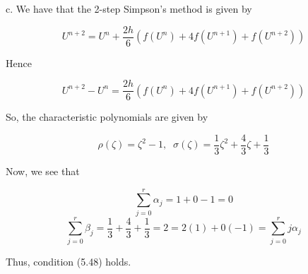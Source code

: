 \begin{solution}
    c. We have that the 2-step Simpson's method is given by

    $$U^{n+2}=U^{n}+\frac{2h}{6}(f(U^n)+4f(U^{n+1})+f(U^{n+2}))$$

    Hence

    $$U^{n+2}-U^{n}=\frac{2h}{6}(f(U^n)+4f(U^{n+1})+f(U^{n+2}))$$

    So, the characteristic polynomials are given by

    $$\rho(\zeta)=\zeta^2-1,\;\; \sigma(\zeta)=\frac13\zeta^2+\frac43\zeta+\frac13$$

    Now, we see that

    $$\sum_{j=0}^r\alpha_j=1+0-1=0$$
    $$\sum_{j=0}^r\beta_j=\frac{1}{3}+\frac43+\frac{1}{3}=2=2(1)+0(-1)=\sum_{j=0}^rj\alpha_j$$

    Thus, condition (5.48) holds.

\end{solution}